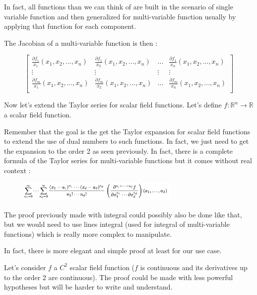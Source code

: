 \documentclass[12pt]{article}
\begin{document}
In fact, all functions than we can think of are built in the scenario of single variable function and then generalized for multi-variable function usually by applying that function for each component. 

The Jacobian of a multi-variable function is then :

$$
\begin{bmatrix}
    \frac{\partial{f_1}}{x_1}(x_1, x_2, ..., x_n) & \frac{\partial{f_1}}{x_2}(x_1, x_2, ..., x_n)  & ... & \frac{\partial{f_1}}{x_n}(x_1, x_2, ..., x_n) \\

    \vdots & \vdots & \vdots & \vdots \\

    \frac{\partial{f_m}}{x_1}(x_1, x_2, ..., x_n) & \frac{\partial{f_m}}{x_2}(x_1, x_2, ..., x_n)  & ...  &\frac{\partial{f_m}}{x_n}(x_1, x_2, ..., x_n) \\
\end{bmatrix}
$$

Now let's extend the Taylor series for scalar field functions. Let's define $f : \mathbb{R}^n \rightarrow \mathbb{R}$ a scalar field function.

Remember that the goal is the get the Taylor expansion for scalar field functions to extend the use of dual numbers to such functions. In fact, we just need to get the expansion to the order 2 as seen previously. In fact, there is a complete formula of the Taylor series for multi-variable functions but it comes without real context :


\begin{figure}[H]
\centering
\includegraphics[width=0.7\textwidth]{assets/images/Dx93rZHiBg.png}
\end{figure}


The proof previously made with integral could possibly also be done like that, but we would need to use lines integral \cite{wiki_line_integral} (used for integral of multi-variable functions) which is really more complex to manipulate.

In fact, there is more elegant and simple proof \cite{stackexchange_derivation_multivariable_taylor_series} at least for our use case.

Let's consider $f$ a $C^2$ scalar field function ($f$ is continuous and its derivatives up to the order 2 are continuous). The proof could be made with less powerful hypotheses but will be harder to write and understand.
\end{document}
